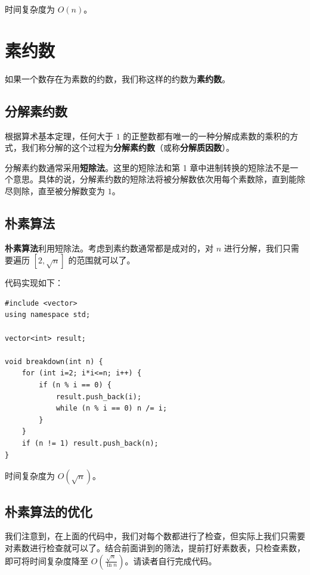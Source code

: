 时间复杂度为 $O(n)$。

\section{素约数}

如果一个数存在为素数的约数，我们称这样的约数为\textbf{素约数}。

\subsection{分解素约数}

根据算术基本定理，任何大于 $1$ 的正整数都有唯一的一种分解成素数的乘积的方式，我们称分解的这个过程为\textbf{分解素约数}（或称\textbf{分解质因数}）。

分解素约数通常采用\textbf{短除法}。这里的短除法和第 1 章中进制转换的短除法不是一个意思。具体的说，分解素约数的短除法将被分解数依次用每个素数除，直到能除尽则除，直至被分解数变为 $1$。

\subsection{朴素算法}

\textbf{朴素算法}利用短除法。考虑到素约数通常都是成对的，对 $n$ 进行分解，我们只需要遍历 $[2, \sqrt{n}]$ 的范围就可以了。

代码实现如下：

\begin{lstlisting}[caption=朴素算法]
#include <vector>
using namespace std;

vector<int> result;

void breakdown(int n) {
    for (int i=2; i*i<=n; i++) {
        if (n % i == 0) {
            result.push_back(i);
            while (n % i == 0) n /= i;
        }
    }
    if (n != 1) result.push_back(n);
}
\end{lstlisting}

时间复杂度为 $O(\sqrt{n})$。

\subsection{朴素算法的优化}

我们注意到，在上面的代码中，我们对每个数都进行了检查，但实际上我们只需要对素数进行检查就可以了。结合前面讲到的筛法，提前打好素数表，只检查素数，即可将时间复杂度降至 $O(\frac{\sqrt{n}}{\ln n})$。请读者自行完成代码。